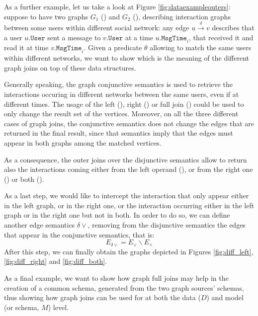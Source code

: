 \begin{example}
As a further example, let us take a look at Figure \ref{fig:dataexampleouters}: suppose to have two graphs $G_1$ () and $G_2$ (), describing interaction graphs between some users within different social network: any edge $u\xrightarrow{\delta}v$ describes that a user $u.\texttt{User}$ sent a message to $v.\texttt{User}$ at a time $u.\texttt{MsgTime}_i$, that received it and read it at time $v.\texttt{MsgTime}_i$. Given a predicate $\theta$ allowing to match the same users within different networks, we want to show which is the meaning of the different graph joins on top of these data structures.

Generally speaking, the graph conjunctive semantics is used to retrieve the interactions occuring in different networks between the same users, even if at different times. The usage of the left (), right () or full join () could be used to only change the result set of the vertices. Moreover, on all the three different cases of graph joins, the conjunctive semantics does not change the edges that are returned in the final result, since that semantics imply that the edges must appear in both graphs among the matched vertices.

As a consequence, the outer joins over the disjunctive semantics allow to return also the interactions coming either from the left operand (), or from the right one () or both ().

As a last step, we would like to intercept the interaction that only appear either in the left graph, or in the right one, or the interaction occurring either in the left graph or in the right one but not in both. In order to do so, we can define another edge semantics $\delta\vee$, removing from the disjunctive semantics the edges that appear in the conjunctive semantics, that is:
\[E_{\delta\vee}=E_\vee\backslash E_\wedge\]
After this step, we can finally obtain the graphs depicted in Figures \ref{fig:diff_left}, \ref{fig:diff_right} and \ref{fig:diff_both}. 
\end{example}

As a final example, we want to show how graph full joins may help in the creation of a common schema, generated from the two graph sources' schemas, thus showing how graph joins can be used for at both the data ($D$) and model (or schema, $M$) level. 


